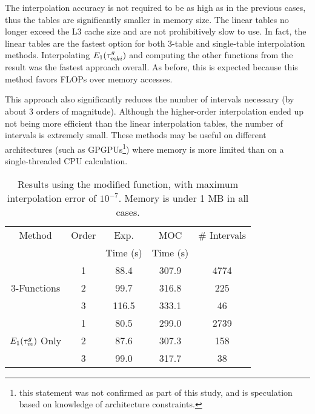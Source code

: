 {{{{        The interpolation accuracy is not required to be as high as in the previous cases, thus the tables are significantly smaller in memory size.
        The linear tables no longer exceed the L3 cache size and are not prohibitively slow to use.
        In fact, the linear tables are the fastest option for both 3-table and single-table interpolation methods.
        Interpolating $E_1(\segopt)$ and computing the other functions from the result was the fastest approach overall.
        As before, this is expected because this method favors \acp{FLOP} over memory accesses.

        This approach also significantly reduces the number of intervals necessary (by about 3 orders of magnitude).
        Although the higher-order interpolation ended up not being more efficient than the linear interpolation tables, the number of intervals is extremely small.
        These methods may be useful on different architectures (such as \acp{GPGPU}\footnote{this statement was not confirmed as part of this study, and is speculation based on knowledge of architecture constraints.}) where memory is more limited than on a single-threaded \ac{CPU} calculation.

        \begin{table}
          \centering
          \caption{Results using the modified function, with maximum interpolation error of $10^{-7}$. Memory is under 1 MB in all cases.}
          \label{tab:LSMOC:ET:Final Results}
          \begin{tabular}{@{}ccccc@{}}\toprule
            Method & Order & Exp.     & \ac{MOC}& \# Intervals \\
                   &       & Time (s) & Time (s) & \\\midrule
            \multirow{3}{*}{3-Functions}      & 1 &  88.4 & 307.9 & 4774\\
                                              & 2 &  99.7 & 316.8 &  225\\
                                              & 3 & 116.5 & 333.1 &   46\\\midrule
            \multirow{3}{*}{$E_1(\opt)$ Only} & 1 &  80.5 & 299.0 & 2739\\
                                              & 2 &  87.6 & 307.3 &  158\\
                                              & 3 &  99.0 & 317.7 &   38\\\bottomrule
          \end{tabular}
        \end{table}
      }
    }
}}

